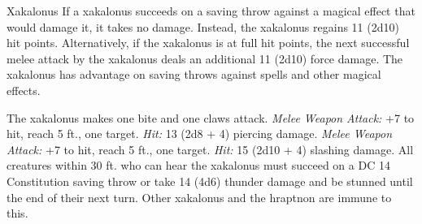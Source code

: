 \documentclass[10pt,a4paper,twoside,twocolumn,openany,bg=print,nodeprecatedcode]{dndbook}
\begin{document}
\begin{DndMonster}[float*=t]{Xakalonus}
\DndMonsterBasics[
armor-class = {16 (natural armor)},
hit-points = {\DndDice{10d8 + 30}},
speed = {30 ft.}
]
\DndMonsterAbilityScores[
 str = 18,
 dex = 15,
 con = 17,
 int = 9,
 wis = 12,
 cha = 9
]
\DndMonsterDetails[
skills = {Perception +4},
senses = {darkvision 120 ft., passive perception 14},
languages = {understands Draconic but can't speak},
challenge = 8,
]
If a xakalonus succeeds on a saving throw against a magical effect that would damage it, it takes no damage. Instead, the xakalonus regains 11 (2d10) hit points. Alternatively, if the xakalonus is at full hit points, the next successful melee attack by the xakalonus deals an additional 11 (2d10) force damage.
The xakalonus has advantage on saving throws against spells and other magical effects.
\par
{}
The xakalonus makes one bite and one claws attack.
\textsl{Melee Weapon Attack:} +7 to hit, reach 5 ft., one target. \textsl{Hit:} 13 (2d8 + 4) piercing damage.
\textsl{Melee Weapon Attack:} +7 to hit, reach 5 ft., one target. \textsl{Hit:} 15 (2d10 + 4) slashing damage.
All creatures within 30 ft. who can hear the xakalonus must succeed on a DC 14 Constitution saving throw or take 14 (4d6) thunder damage and be stunned until the end of their next turn. Other xakalonus and the hraptnon are immune to this.
\end{DndMonster}
\end{document}

